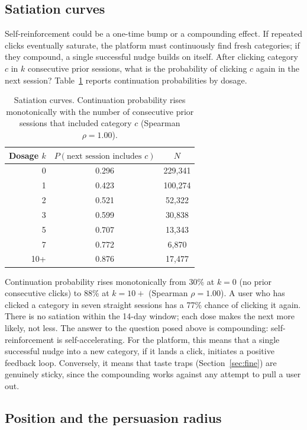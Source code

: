 \documentclass[11pt]{article}
\begin{document}
\subsection{Satiation curves}

Self-reinforcement could be a one-time bump or a compounding effect. If repeated clicks eventually saturate, the platform must continuously find fresh categories; if they compound, a single successful nudge builds on itself. After clicking category~$c$ in $k$ consecutive prior sessions, what is the probability of clicking $c$ again in the next session? Table~\ref{tab:satiation} reports continuation probabilities by dosage.

\begin{table}[ht]
\centering
\caption{Satiation curves. Continuation probability rises monotonically with the number of consecutive prior sessions that included category $c$ (Spearman $\rho = 1.00$).}
\label{tab:satiation}
\begin{tabular}{rcc}
\toprule
Dosage $k$ & $P(\text{next session includes } c)$ & $N$ \\
\midrule
0 & 0.296 & 229,341 \\
1 & 0.423 & 100,274 \\
2 & 0.521 & 52,322 \\
3 & 0.599 & 30,838 \\
5 & 0.707 & 13,343 \\
7 & 0.772 & 6,870 \\
10+ & 0.876 & 17,477 \\
\bottomrule
\end{tabular}
\end{table}
\FloatBarrier

Continuation probability rises monotonically from 30\% at $k = 0$ (no prior consecutive clicks) to 88\% at $k = 10{+}$ (Spearman $\rho = 1.00$). A user who has clicked a category in seven straight sessions has a 77\% chance of clicking it again. There is no satiation within the 14-day window; each dose makes the next more likely, not less. The answer to the question posed above is compounding: self-reinforcement is self-accelerating. For the platform, this means that a single successful nudge into a new category, if it lands a click, initiates a positive feedback loop. Conversely, it means that taste traps (Section~\ref{sec:fine}) are genuinely sticky, since the compounding works against any attempt to pull a user out.

\subsection{Position and the persuasion radius}
\end{document}
